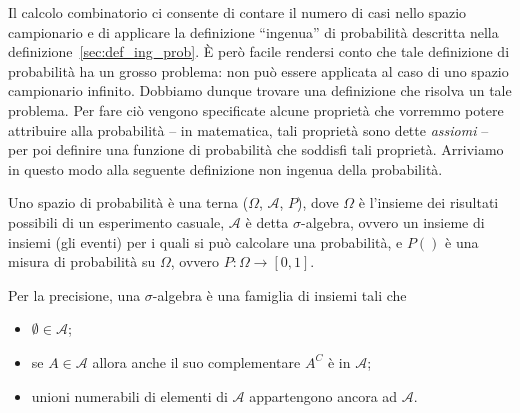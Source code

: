 Il calcolo combinatorio ci consente di contare il numero di casi nello spazio campionario e di applicare la definizione \enquote{ingenua} di probabilità descritta nella definizione~\ref{sec:def_ing_prob}.
È però facile rendersi conto che tale definizione di probabilità ha un grosso problema: non può essere applicata al caso di uno spazio campionario infinito. 
Dobbiamo dunque trovare una definizione che risolva un tale problema.
Per fare ciò vengono specificate alcune proprietà che vorremmo potere attribuire alla probabilità -- in matematica, tali proprietà sono dette \emph{assiomi} -- per poi definire una funzione di probabilità che soddisfi tali proprietà.
Arriviamo in questo modo alla seguente definizione non ingenua della probabilità.
\begin{defn}
\label{def:assiomi_Kolmogorov}
Uno spazio di probabilità è una terna ($\Omega$, $\mathcal{A}$, $P$), dove $\Omega$ è l'insieme dei risultati possibili di un esperimento casuale, $\mathcal{A}$ è detta $\sigma$-algebra, ovvero un insieme di insiemi (gli eventi) per i quali si può calcolare una probabilità, e $P()$ è una misura di probabilità su $\Omega$, ovvero $P: \Omega \rightarrow [0, 1]$.
\end{defn}
Per la precisione, una $\sigma$-algebra è una famiglia di insiemi tali che
\begin{itemize}
\item $\emptyset \in \mathcal{A}$;
\item se $A \in \mathcal{A}$ allora anche il suo complementare $A^C$ è in $\mathcal{A}$; 
\item unioni numerabili di elementi di $\mathcal{A}$ appartengono ancora ad $\mathcal{A}$.
\end{itemize}

